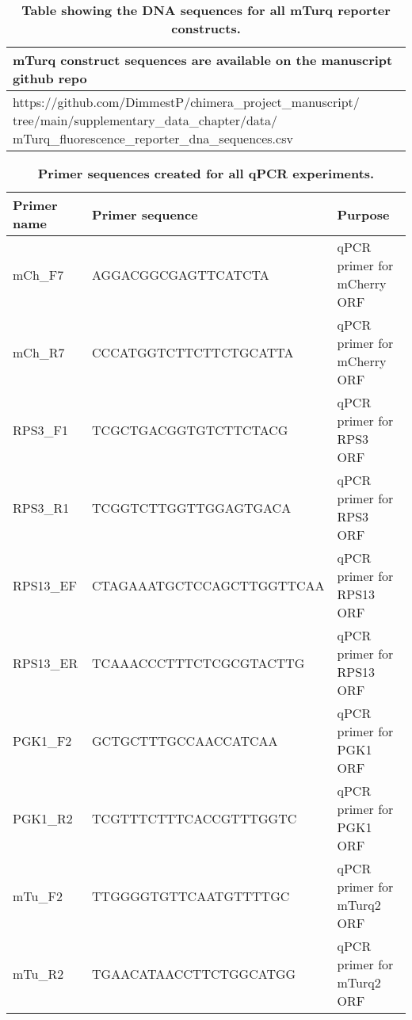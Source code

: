 \documentclass[../main.tex]{subfiles}
\begin{document}
\begin{table}[h!]


\centering
\setlength{\tabcolsep}{5pt}\fontsize{6}{6}\selectfont
\begin{tabular}[t]{>{\centering\arraybackslash}p{30em}}
\hline
mTurq construct sequences are available on the manuscript github repo\\
\hline
https://github.com/DimmestP/chimera\_project\_manuscript/ tree/main/supplementary\_data\_chapter/data/ mTurq\_fluorescence\_reporter\_dna\_sequences.csv\\
\hline
\end{tabular}
\caption[Table showing the DNA sequences for all mTurq reporter constructs.]{\label{tab:mTurq-seq}\textbf{Table showing the DNA sequences for all mTurq reporter constructs.}}
\end{table}


\begin{table}[h!]


\centering
\setlength{\tabcolsep}{5pt}\fontsize{6}{6}\selectfont
\begin{tabularx}{0.95\textwidth} { 
  | >{\centering\arraybackslash}X 
  | >{\centering\arraybackslash}X
  | >{\centering\arraybackslash}X | }
\hline
\begingroup\setlength{\tabcolsep}{5pt}\fontsize{6}{6}\selectfont \textbf{Primer name}\endgroup & \begingroup\setlength{\tabcolsep}{5pt}\fontsize{6}{6}\selectfont \textbf{Primer sequence}\endgroup & \begingroup\setlength{\tabcolsep}{5pt}\fontsize{6}{6}\selectfont \textbf{Purpose}\endgroup\\
\hline
mCh\_F7 & AGGACGGCGAGTTCATCTA & qPCR primer for mCherry ORF\\
\hline
mCh\_R7 & CCCATGGTCTTCTTCTGCATTA & qPCR primer for mCherry ORF\\
\hline
RPS3\_F1 & TCGCTGACGGTGTCTTCTACG & qPCR primer for RPS3 ORF\\
\hline
RPS3\_R1 & TCGGTCTTGGTTGGAGTGACA & qPCR primer for RPS3 ORF\\
\hline
RPS13\_EF & CTAGAAATGCTCCAGCTTGGTTCAA & qPCR primer for RPS13 ORF\\
\hline
RPS13\_ER & TCAAACCCTTTCTCGCGTACTTG & qPCR primer for RPS13 ORF\\
\hline
PGK1\_F2 & GCTGCTTTGCCAACCATCAA & qPCR primer for PGK1 ORF\\
\hline
PGK1\_R2 & TCGTTTCTTTCACCGTTTGGTC & qPCR primer for PGK1 ORF\\
\hline
mTu\_F2 & TTGGGGTGTTCAATGTTTTGC & qPCR primer for mTurq2 ORF\\
\hline
mTu\_R2 & TGAACATAACCTTCTGGCATGG & qPCR primer for mTurq2 ORF\\
\hline
\end{tabularx}
\caption[Primer sequences created for all qPCR experiments.]{\label{tab:chimera-qpcr-primers-table}\textbf{Primer sequences created for all qPCR experiments.}}
\end{table}
\end{document}
